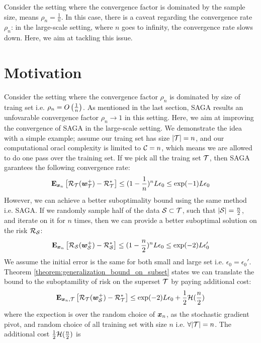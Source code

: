 \documentclass{article}
\begin{document}
 Consider the setting where
the convergence factor is dominated by the sample size, means $\rho_n = \frac{1}{n}$. In this case, there is a caveat
regarding the convergence rate $\rho_n$:
in the large-scale setting, where $n$ goes to infinity, the convergence rate
slows down. Here, we aim at tackling this issue.
\section{Motivation} 
Consider the setting where the convergence factor $\rho_n$ is dominated by
size of traing set i.e. $\rho_n = \bigO\left(\frac{1}{n}\right)$. As mentioned
in the last section, SAGA results an unfovarable convergence factor $\rho_n \to 1$ in this
setting.
Here, we aim at improving the convergence of SAGA in the large-scale setting. We
demonstrate the idea with a simple example; assume our traing set has size $|\T|
= n$, and our computational oracl complexity is limited to $\C = n$, which means
we are allowed to do one pass over the training set.
 If we pick all the traing set $\T$, then SAGA garantees the following
 convergence rate:
 \begin{equation*}
 	\E_{\x_{n}} \left[\risk_{\T}( \w_{\T}^+) - \risk^*_{\T}\right] \leq 
 	(1-\frac{1}{n})^n L \epsilon_0 \leq \exp(-1) L\epsilon_0
 \end{equation*}
However, we can achieve a better suboptimality bound using the same method i.e.
SAGA. If we randomly sample half of the data $\S \subset \T$, such that $|\S| =
\frac{n}{2}$, and iterate on it for $n$ times, then we can provide a better
suboptimal solution on the risk $\risk_{\S}$: 
\begin{equation*}
	\E_{\x_{n}} \left[ \risk_{\S}( \w_{\S}^+) - \risk^*_{\S}\right] \leq (1-
	\frac{n}{2}) ^n L \epsilon_0 \leq \exp(-2) L \epsilon_0'
\end{equation*}
We assume the initial error is the same for both small and large set i.e.
$\epsilon_0 = \epsilon_0'$. Theorem
\ref{theorem:generalization_bound_on_subset} states we can translate the bound
to the suboptamility of risk on the superset $\T$ by paying additional cost: 
\begin{equation*}
	\E_{\x_n, \T} \left[\risk_{\T} (\w_{\S}^+) - \risk^*_{\T} \right] \leq 
	\exp(-2) L \epsilon_0 + \frac{1}{2} \bound(\frac{n}{2})
\end{equation*}
where the expection is over the random choice of $\x_n$, as the stochastic
gradient pivot, and random choice of all training set with size $n$ i.e.
$\forall |\T| = n$. The additional cost $\frac{1}{2} \bound(\frac{n}{2})$ is
\end{document}
